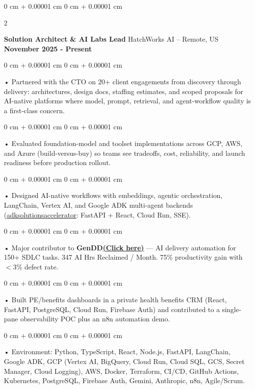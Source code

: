 \documentclass[10pt, letterpaper]{article}
\newenvironment{onecolentry}{
    \begin{adjustwidth}{
        0 cm + 0.00001 cm
    }{
        0 cm + 0.00001 cm
    }
}{
    \end{adjustwidth}
} %
\newenvironment{twocolentry}[2][]{
    \onecolentry
    \def\secondColumn{#2}
    \setcolumnwidth{\fill, 4.5 cm}
    \begin{paracol}{2}
}{
    \switchcolumn \raggedleft \secondColumn
    \end{paracol}
    \endonecolentry
} %
\begin{document}
        \begin{twocolentry}{
            \textbf{November 2025 - Present}
        }
            \textbf{Solution Architect \& AI Labs Lead} HatchWorks AI -- Remote, US\end{twocolentry}

        \begin{onecolentry}
             • Partnered with the CTO on 20+ client engagements from discovery through delivery: architectures, design docs, staffing estimates, and scoped proposals for AI-native platforms where model, prompt, retrieval, and agent-workflow quality is a first-class concern.
        \end{onecolentry}
        \begin{onecolentry}
             • Evaluated foundation-model and toolset implementations across GCP, AWS, and Azure (build-versus-buy) so teams see tradeoffs, cost, reliability, and launch readiness before production rollout.
        \end{onecolentry}
        \begin{onecolentry}
             • Designed AI-native workflows with embeddings, agentic orchestration, LangChain, Vertex AI, and Google ADK multi-agent backends (\href{https://github.com/sreenikethaathreya-hw/adksolutionsaccelerator}{adksolutionsaccelerator}: FastAPI + React, Cloud Run, SSE).
        \end{onecolentry}
        \begin{onecolentry}
             • Major contributor to \textbf{GenDD}\href{https://hatchworks.com/generative-driven-development/}{\textbf{(Click here)}} --- AI delivery automation for 150+ SDLC tasks. 347 AI Hrs Reclaimed / Month. 75\% productivity gain with $<$3\% defect rate.
        \end{onecolentry}
        \begin{onecolentry}
             • Built PE/benefits dashboards in a private health benefits CRM (React, FastAPI, PostgreSQL, Cloud Run, Firebase Auth) and contributed to a single-pane observability POC plus an n8n automation demo.
        \end{onecolentry}
        \begin{onecolentry}
             • Environment: Python, TypeScript, React, Node.js, FastAPI, LangChain, Google ADK, GCP (Vertex AI, BigQuery, Cloud Run, Cloud SQL, GCS, Secret Manager, Cloud Logging), AWS, Docker, Terraform, CI/CD, GitHub Actions, Kubernetes, PostgreSQL, Firebase Auth, Gemini, Anthropic, n8n, Agile/Scrum.
        \end{onecolentry}
\end{document}
